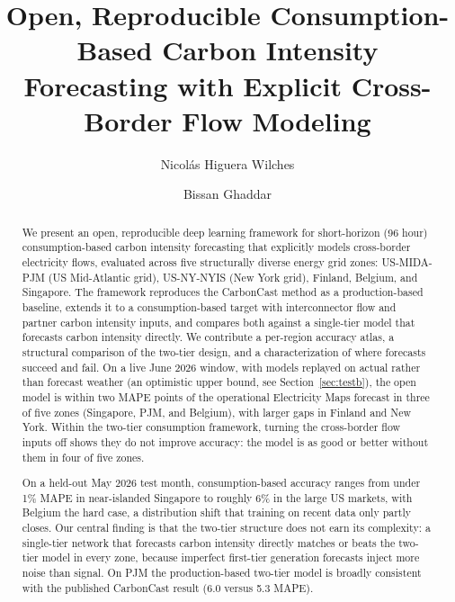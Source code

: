\documentclass[sigconf,nonacm,a4paper]{acmart}  %
\title{Open, Reproducible Consumption-Based Carbon Intensity Forecasting with Explicit Cross-Border Flow Modeling}
\author{Nicol\'as Higuera Wilches}
\affiliation{
  \institution{IE University, School of Science and Technology}
  \city{Madrid}
  \country{Spain}
}
\author{Bissan Ghaddar}
\affiliation{
  \institution{IE University, School of Science and Technology}
  \city{Madrid}
  \country{Spain}
}
\begin{document}
\thispagestyle{plain}
\pagestyle{plain}


\begin{abstract}
We present an open, reproducible deep learning framework for short-horizon (96
hour) consumption-based carbon intensity forecasting that explicitly models
cross-border electricity flows, evaluated across five structurally diverse energy grid
zones: US-MIDA-PJM (US Mid-Atlantic grid), US-NY-NYIS (New York grid), Finland, Belgium, and Singapore. The framework
reproduces the CarbonCast method as a production-based baseline,
extends it to a consumption-based target with interconnector flow and partner
carbon intensity inputs, and compares both against a single-tier model that
forecasts carbon intensity directly. We contribute a per-region accuracy atlas, a
structural comparison of the two-tier design, and a characterization of where
forecasts succeed and fail. On a live June 2026 window, with models replayed on actual rather than forecast
weather (an optimistic upper bound, see Section~\ref{sec:testb}), the open model
is within two MAPE points of the operational Electricity Maps forecast in three of
five zones (Singapore, PJM, and Belgium), with larger gaps in Finland and New York. Within the two-tier consumption
framework, turning the cross-border flow inputs off shows they do not improve
accuracy: the model is as good or better without them in four of five zones.

On a held-out May 2026 test month, consumption-based accuracy ranges from under 1\% MAPE in near-islanded Singapore to roughly 6\% in the large US markets, with Belgium the hard case, a distribution shift that training on recent data only partly closes. Our central finding is that the two-tier structure does not earn its complexity: a single-tier network that forecasts carbon intensity directly matches or beats the two-tier
model in every zone, because imperfect first-tier generation forecasts inject more
noise than signal. On PJM the production-based two-tier model is broadly consistent
with the published CarbonCast result (6.0 versus 5.3 MAPE).
\end{abstract}

\maketitle

\end{document}
